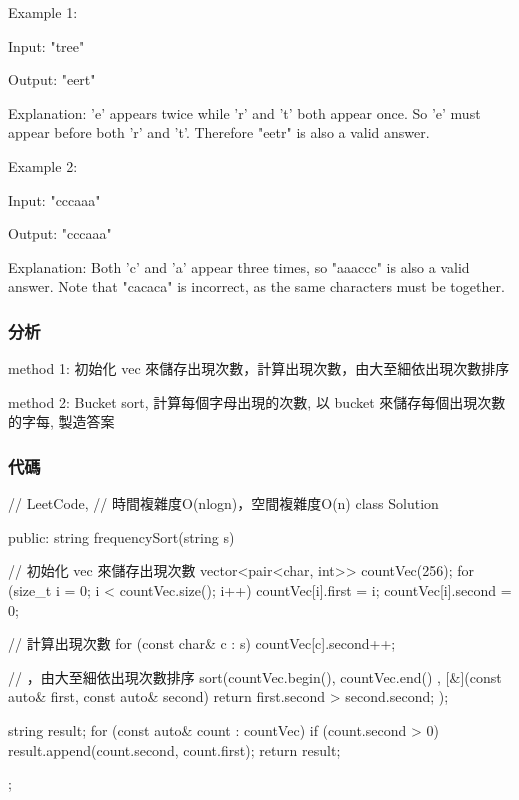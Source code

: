 Example 1:
\begin{Code}
Input:
"tree"

Output:
"eert"

Explanation:
'e' appears twice while 'r' and 't' both appear once.
So 'e' must appear before both 'r' and 't'. Therefore "eetr" is also a valid answer.
\end{Code}

Example 2:
\begin{Code}
Input:
"cccaaa"

Output:
"cccaaa"

Explanation:
Both 'c' and 'a' appear three times, so "aaaccc" is also a valid answer.
Note that "cacaca" is incorrect, as the same characters must be together.
\end{Code}

\subsubsection{分析}
method 1: 初始化 vec 來儲存出現次數，計算出現次數，由大至細依出現次數排序

method 2: Bucket sort, 計算每個字母出現的次數, 以 bucket 來儲存每個出現次數的字每, 製造答案

\subsubsection{代碼}
\begin{Code}
// LeetCode,
// 時間複雜度O(nlogn)，空間複雜度O(n)
class Solution {
public:
    string frequencySort(string s) {
        // 初始化 vec 來儲存出現次數
        vector<pair<char, int>> countVec(256);
        for (size_t i = 0; i < countVec.size(); i++)
        {
            countVec[i].first = i;
            countVec[i].second = 0;
        }

        // 計算出現次數
        for (const char& c : s)
            countVec[c].second++;

        // ，由大至細依出現次數排序
        sort(countVec.begin(), countVec.end()
             , [&](const auto& first, const auto& second)
                  {
                      return first.second > second.second;
                  });

        string result;
        for (const auto& count : countVec)
        {
            if (count.second > 0)
                result.append(count.second, count.first);
        }
        return result;
    }
};
\end{Code}


